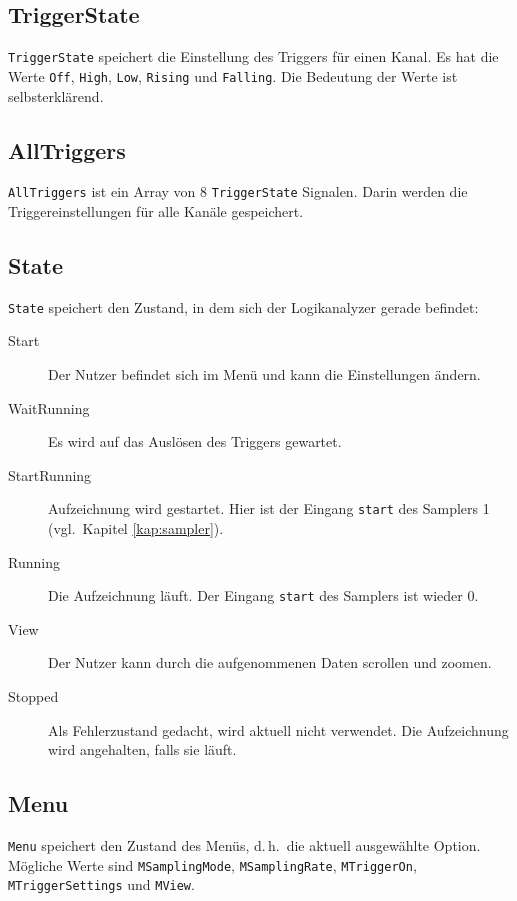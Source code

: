 \documentclass[IN,ngerman,utf8,12pt]{tumbook}
\newcommand{\dah}{d.\,h.\ }
\newcommand{\vgl}{vgl.\ }
\begin{document}
\subsection{TriggerState}
\label{kap:triggerstate}
\texttt{TriggerState} speichert die Einstellung des Triggers für einen Kanal.
Es hat die Werte \texttt{Off}, \texttt{High}, \texttt{Low}, \texttt{Rising} und \texttt{Falling}.
Die Bedeutung der Werte ist selbsterklärend.

\subsection{AllTriggers}
\label{kap:alltriggers}
\texttt{AllTriggers} ist ein Array von 8 \texttt{TriggerState} Signalen.
Darin werden die Triggereinstellungen für alle Kanäle gespeichert.

\subsection{State}
\label{kap:state}
\texttt{State} speichert den Zustand, in dem sich der Logikanalyzer gerade befindet:
\begin{description}
    \item[Start] Der Nutzer befindet sich im Menü und kann die Einstellungen ändern.
    \item[WaitRunning] Es wird auf das Auslösen des Triggers gewartet.
    \item[StartRunning] Aufzeichnung wird gestartet.
        Hier ist der Eingang \texttt{start} des Samplers 1 (\vgl Kapitel \ref{kap:sampler}).
    \item[Running] Die Aufzeichnung läuft. Der Eingang \texttt{start} des Samplers ist wieder 0.
    \item[View] Der Nutzer kann durch die aufgenommenen Daten scrollen und zoomen.
    \item[Stopped] Als Fehlerzustand gedacht, wird aktuell nicht verwendet.
        Die Aufzeichnung wird angehalten, falls sie läuft.
\end{description}

\subsection{Menu}
\label{kap:menu}
\texttt{Menu} speichert den Zustand des Menüs, \dah die aktuell ausgewählte Option.
Mögliche Werte sind \texttt{MSamplingMode}, \texttt{MSamplingRate}, \texttt{MTriggerOn}, \texttt{MTriggerSettings} und \texttt{MView}.
\end{document}
